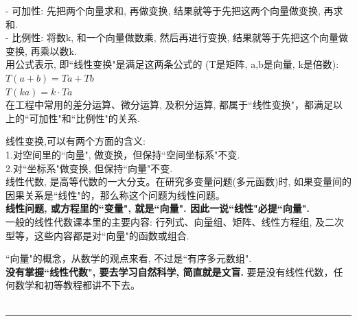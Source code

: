 \documentclass[UTF8]{ctexart}
\begin{document}
- 可加性: 先把两个向量求和, 再做变换, 结果就等于先把这两个向量做变换, 再求和. \\
- 比例性: 将数k, 和一个向量做数乘, 然后再进行变换, 结果就等于先把这个向量做变换, 再乘以数k. \\

用公式表示, 即``线性变换"是满足这两条公式的 (T是矩阵, a,b是向量, k是倍数): \\
$T(a+b)=Ta+Tb$ \\
$T(ka) = k \cdot Ta$ \\

在工程中常用的差分运算、微分运算, 及积分运算, 都属于``线性变换"，都满足以上的``可加性"和``比例性"的关系.

线性变换,可以有两个方面的含义: \\
1.对空间里的``向量", 做变换，但保持``空间坐标系"不变. \\
2.对``坐标系"做变换, 但保持``向量"不变. \\

线性代数, 是高等代数的一大分支。在研究多变量问题(多元函数)时, 如果变量间的因果关系是``线性"的，那么称这个问题为线性问题。\\

\textbf{线性问题, 或方程里的``变量", 就是``向量". 因此一说``线性"必提``向量".} \\
一般的线性代数课本里的主要内容: 行列式、向量组、矩阵、线性方程组, 及二次型等，这些内容都是对``向量"的函数或组合.

``向量"的概念，从数学的观点来看, 不过是``有序多元数组".\\
\textbf{没有掌握``线性代数", 要去学习自然科学, 简直就是文盲.} 要是没有线性代数，任何数学和初等教程都讲不下去。\\


~\\
\hrule
~\\
\end{document}
